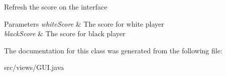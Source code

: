 Refresh the score on the interface 
\begin{DoxyParams}{Parameters}
{\em white\+Score} & The score for white player \\
\hline
{\em black\+Score} & The score for black player \\
\hline
\end{DoxyParams}


The documentation for this class was generated from the following file\+:\begin{DoxyCompactItemize}
\item 
src/views/G\+U\+I.\+java\end{DoxyCompactItemize}
